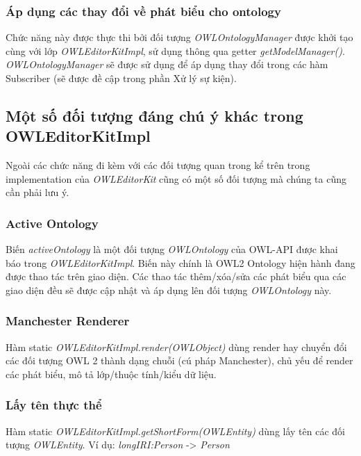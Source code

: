 \subsubsection{Áp dụng các thay đổi về phát biểu cho ontology}
Chức năng này được thực thi bởi đối tượng \textit{OWLOntologyManager} được khởi tạo cùng với lớp \textit{OWLEditorKitImpl}, sử dụng thông qua getter \textit{getModelManager()}.
\textit{OWLOntologyManager} sẽ được sử dụng để áp dụng thay đổi trong các hàm Subscriber (sẽ được đề cập trong phần Xử lý sự kiện).

\subsection{Một số đối tượng đáng chú ý khác trong OWLEditorKitImpl}
Ngoài các chức năng đi kèm với các đối tượng quan trong kể trên trong implementation của \textit{OWLEditorKit} cũng có một số đối tượng mà chúng ta cũng cần phải lưu ý.
\subsubsection{Active Ontology}
Biến  \textit{activeOntology} là một đối tượng \textit{OWLOntology} của OWL-API được khai báo trong \textit{OWLEditorKitImpl}. Biến này chính là OWL2 Ontology hiện hành đang được thao tác trên giao diện. Các thao tác thêm/xóa/sửa các phát biểu qua các giao diện đều sẽ được cập nhật và áp dụng lên đối tượng \textit{OWLOntology} này.
\subsubsection{Manchester Renderer}
Hàm static \textit{OWLEditorKitImpl.render(OWLObject)} dùng render hay chuyển đổi các đối tượng OWL 2 thành dạng chuỗi (cú pháp Manchester), chủ yếu để render các phát biểu, mô tả lớp/thuộc tính/kiểu dữ liệu.
\subsubsection{Lấy tên thực thể}
Hàm static \textit{OWLEditorKitImpl.getShortForm(OWLEntity)} dùng lấy tên các đối tượng \textit{OWLEntity}. Ví dụ: \textit{longIRI:Person} -> \textit{Person}


